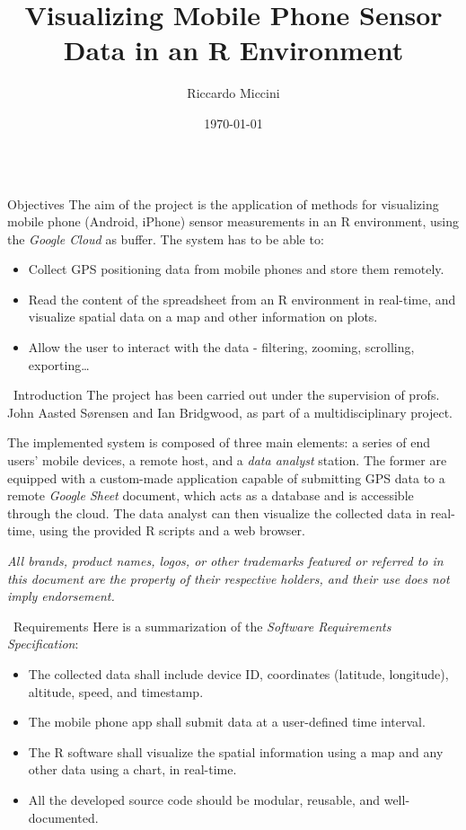 \documentclass[final]{beamer}
\title{Visualizing Mobile Phone Sensor Data in an R Environment}
\author{Riccardo Miccini}
\institute{Technical University of Denmark - DTU}
\date{\today}
\newlength{\onecolwid}
\begin{document}
\begin{frame}[t]
\begin{columns}[t]

\begin{column}{\onecolwid}
	\begin{alertblock}{Objectives}
		The aim of the project is the application of methods for visualizing mobile phone (Android, iPhone) sensor measurements in an R environment, using the \emph{Google Cloud} as buffer.
		The system has to be able to:
		\begin{itemize}
			\item Collect GPS positioning data from mobile phones and store them remotely.
			\item Read the content of the spreadsheet from an R environment in real-time, and visualize spatial data on a map and other information on plots.
			\item Allow the user to interact with the data - filtering, zooming, scrolling, exporting\dots
		\end{itemize}
	\end{alertblock}

	\begin{block}{\faCommenting \, Introduction}
		The project has been carried out under the supervision of profs. John Aasted S{\o}rensen and Ian Bridgwood, as part of a multidisciplinary project.

		The implemented system is composed of three main elements: a series of end users' mobile devices, a remote host, and a \emph{data analyst} station.
		The former are equipped with a custom-made application capable of submitting GPS data to a remote \emph{Google Sheet} document, which acts as a database and is accessible through the cloud.
		The data analyst can then visualize the collected data in real-time, using the provided R scripts and a web browser.

		\bigskip

		\small{\emph{All brands, product names, logos, or other trademarks featured or referred to in this document are the property of their respective holders, and their use does not imply endorsement.}}
	\end{block}

	\begin{block}{\faListUl \, Requirements}
		Here is a summarization of the \emph{Software Requirements Specification}:
		\begin{itemize}
			\item The collected data shall include device ID, coordinates (latitude, longitude), altitude, speed, and timestamp.
			\item The mobile phone app shall submit data at a user-defined time interval.
			\item The R software shall visualize the spatial information using a map and any other data using a chart, in real-time.
			\item All the developed source code should be modular, reusable, and well-documented.
		\end{itemize}
	\end{block}
\end{column}


\end{columns}
\end{frame}
\end{document}
